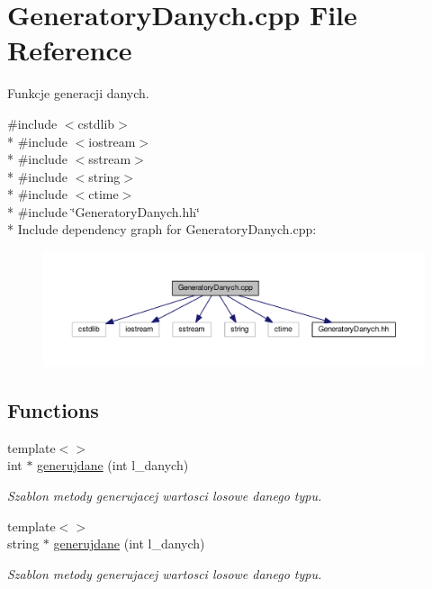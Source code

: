 \hypertarget{a00041}{}\section{Generatory\+Danych.\+cpp File Reference}
\label{a00041}


Funkcje generacji danych.  


{\ttfamily \#include $<$cstdlib$>$}\\*
{\ttfamily \#include $<$iostream$>$}\\*
{\ttfamily \#include $<$sstream$>$}\\*
{\ttfamily \#include $<$string$>$}\\*
{\ttfamily \#include $<$ctime$>$}\\*
{\ttfamily \#include \char`\"{}Generatory\+Danych.\+hh\char`\"{}}\\*
Include dependency graph for Generatory\+Danych.\+cpp\+:
\nopagebreak
\begin{figure}[H]
\begin{center}
\leavevmode
\includegraphics[width=350pt]{a00092}
\end{center}
\end{figure}
\subsection*{Functions}
\begin{DoxyCompactItemize}
\item 
{\footnotesize template$<$$>$ }\\int $\ast$ \hyperlink{a00041_adcc5cc7e15775ae8116ea54eec54c368}{generujdane} (int l\+\_\+danych)
\begin{DoxyCompactList}\small\item\em Szablon metody generujacej wartosci losowe danego typu. \end{DoxyCompactList}\item 
{\footnotesize template$<$$>$ }\\string $\ast$ \hyperlink{a00041_ab57af5d6f8c119c3ddc106324663ae85}{generujdane} (int l\+\_\+danych)
\begin{DoxyCompactList}\small\item\em Szablon metody generujacej wartosci losowe danego typu. \end{DoxyCompactList}\end{DoxyCompactItemize}


